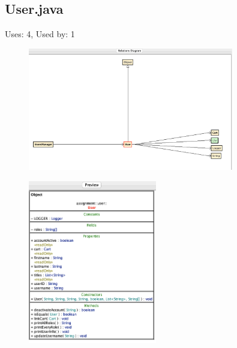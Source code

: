\documentclass{article}
\begin{document}
\subsection{User.java}
Uses: 4, Used by: 1
\begin{figure}[H]
    \centering
    \includegraphics[width=0.8\textwidth]{img/userDiagram.png}
\end{figure}
\begin{figure}[H]
    \centering
    \includegraphics[width=0.5\textwidth]{img/userPreview.png}
\end{figure}
\end{document}
